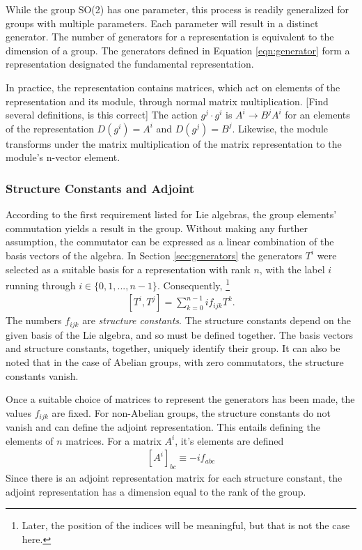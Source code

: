 While the group SO(2) has one parameter, this process is readily generalized for groups with multiple parameters. Each parameter will result in a distinct generator.
The number of generators for a representation is equivalent to the dimension of a group.
The generators defined in Equation \ref{eqn:generator} form a representation designated the fundamental representation.

In practice, the representation contains \nxn matrices, which act on elements of the representation and its module, through normal matrix multiplication. {\color{red} [Find several definitions, is this correct]}
The action $g^j\cdot g^i$ is $A^i\to B^jA^i$ for an elements of the representation $D(g^i)=A^i$ and $D(g^j)=B^j$.
Likewise, the module transforms under the matrix multiplication of the \nxn matrix representation to the module's n-vector element. \check




\subsubsection{Structure Constants and Adjoint}\label{sec:adjoint}
According to the first requirement listed for Lie algebras, the group elements' commutation yields a result in the group.
Without making any further assumption, the commutator can be expressed as a linear combination of the basis vectors of the algebra.
In Section \ref{sec:generators} the generators $T^i$ were selected as a suitable basis for a representation with rank $n$, with the label $i$ running through $i\in\{0,1,...,n-1\}$.
Consequently, \footnote{Later, the position of the indices will be meaningful, but that is not the case here.}
\begin{equation}\begin{split}\label{eqn:structure}
    [T^i,T^j]=\sum_{k=0}^{n-1}if_{ijk}T^k.
\end{split}\end{equation} 
The numbers $f_{ijk}$ are \emph{structure constants}. 
The structure constants depend on the given basis of the Lie algebra, and so must be defined together.
The basis vectors and structure constants, together, uniquely identify their group.
It can also be noted that in the case of Abelian groups, with zero commutators, the structure constants vanish.

Once a suitable choice of matrices to represent the generators has been made, the values $f_{ijk}$ are fixed.
For non-Abelian groups, the structure constants do not vanish and can define the adjoint representation.
This entails defining the \nxn elements of $n$ matrices.
For a matrix $A^i$, it's elements are defined
\begin{equation}\begin{split}\label{eqn:adjoint}
[A^i]_{bc}\equiv-if_{abc}
\end{split}\end{equation} 
Since there is an adjoint representation matrix for each structure constant, the adjoint representation has a dimension equal to the rank of the group.

